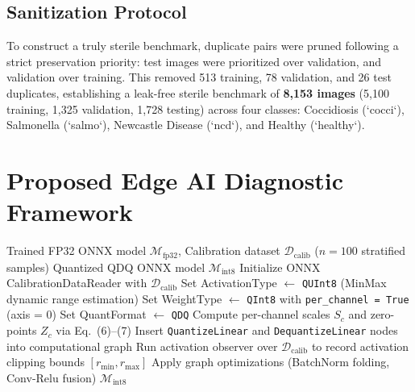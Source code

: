 \documentclass[11pt,a4paper]{article}
\begin{document}
\subsection{Sanitization Protocol}
To construct a truly sterile benchmark, duplicate pairs were pruned following a strict preservation priority: test images were prioritized over validation, and validation over training. This removed 513 training, 78 validation, and 26 test duplicates, establishing a leak-free sterile benchmark of \textbf{8,153 images} (5,100 training, 1,325 validation, 1,728 testing) across four classes: Coccidiosis (`cocci`), Salmonella (`salmo`), Newcastle Disease (`ncd`), and Healthy (`healthy`).

\section{Proposed Edge AI Diagnostic Framework}

\begin{algorithm}[H]
\caption{Static Per-Channel QDQ Calibration and Export Pipeline}
\begin{algorithmic}[1]
\Require Trained FP32 ONNX model $\mathcal{M}_{\text{fp32}}$, Calibration dataset $\mathcal{D}_{\text{calib}}$ ($n=100$ stratified samples)
\Ensure Quantized QDQ ONNX model $\mathcal{M}_{\text{int8}}$
\State Initialize ONNX CalibrationDataReader with $\mathcal{D}_{\text{calib}}$
\State Set ActivationType $\leftarrow$ \texttt{QUInt8} (MinMax dynamic range estimation)
\State Set WeightType $\leftarrow$ \texttt{QInt8} with \texttt{per\_channel = True} (axis = 0)
\State Set QuantFormat $\leftarrow$ \texttt{QDQ}
    \State Compute per-channel scales $S_c$ and zero-points $Z_c$ via Eq.~(6)--(7)
    \State Insert \texttt{QuantizeLinear} and \texttt{DequantizeLinear} nodes into computational graph
\EndFor
\State Run activation observer over $\mathcal{D}_{\text{calib}}$ to record activation clipping bounds $[r_{\min}, r_{\max}]$
\State Apply graph optimizations (BatchNorm folding, Conv-Relu fusion)
\State \Return $\mathcal{M}_{\text{int8}}$
\end{algorithmic}
\end{algorithm}
\end{document}
